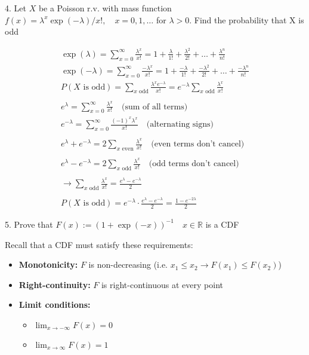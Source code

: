 \documentclass[10pt]{article}
\begin{document}
\newpage

4. Let $X$ be a Poisson r.v. with mass function $f(x) = \lambda^x\exp(-\lambda) / x!, \quad x = 0, 1, …$ for $\lambda > 0$. Find the probability that X is odd

\begin{align*}
    \exp (\lambda) = \sum_{x = 0}^{\infty} \frac{\lambda^x}{x!} = 1 + \frac{\lambda}{1!} + \frac{\lambda^2}{2!} + … + \frac{\lambda^n}{n!}\\
    \exp (-\lambda) = \sum_{x = 0}^{\infty} \frac{-\lambda^x}{x!} = 1 + \frac{-\lambda}{1!} + \frac{-\lambda^2}{2!} + … + \frac{-\lambda^n}{n!}\\
    P(X \text{ is odd}) = \sum_{x \text{ odd}} \frac{\lambda^x e^{-\lambda}}{x!} = e^{-\lambda} \sum_{x \text{ odd}} \frac{\lambda^x}{x!}\\
    \\
    e^{\lambda} = \sum_{x=0}^{\infty} \frac{\lambda^x}{x!}\quad\text{(sum of all terms)}\\
    e^{-\lambda} = \sum_{x=0}^{\infty} \frac{(-1)^x\lambda^x}{x!}\quad\text{(alternating signs)}\\
    \\
    e^{\lambda} + e^{-\lambda} = 2\sum_{x \text{ even}} \frac{\lambda^x}{x!} \quad\text{(even terms don't cancel)}\\
    \\
    e^{\lambda} - e^{-\lambda} = 2\sum_{x \text{ odd}} \frac{\lambda^x}{x!}\quad\text{(odd terms don't cancel)}\\
    \\
    \to \sum_{x \text{ odd}} \frac{\lambda^x}{x!} = \frac{e^{\lambda} - e^{-\lambda}}{2}\\
    \\
    P(X \text{ is odd}) = e^{-\lambda} \cdot \frac{e^{\lambda} - e^{-\lambda}}{2} = \frac{1 - e^{-2\lambda}}{2}
\end{align*}

\newpage

5. Prove that $F(x) := (1 + \exp (-x))^{-1}\quad x \in \mathbb{R}$ is a CDF

Recall that a CDF must satisfy these requirements:

\begin{itemize}
    \item \textbf{Monotonicity:} $F$ is non-decreasing (i.e. $x_1 \leq x_2 \to F(x_1) \leq F(x_2)$)
    \item \textbf{Right-continuity:} $F$ is right-continuous at every point
    \item \textbf{Limit conditions:} 
    \begin{itemize}
        \item $\lim_{x \to -\infty} F(x) = 0$
        \item $\lim_{x \to \infty} F(x) = 1$
    \end{itemize}
\end{itemize}
\end{document}
